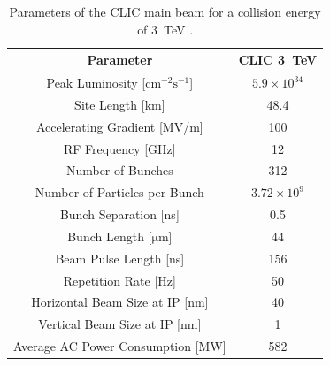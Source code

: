 \begin{table}
  \begin{center}
  	\begin{tabular}{| c c |}
	   \hline
       Parameter & CLIC 3~TeV\\
       \hline
       Peak Luminosity [\(\mathrm{cm^{-2}s^{-1}}\)] & \(5.9\times10^{34}\) \\
       Site Length [km] & 48.4 \\
       Accelerating Gradient [MV/m] & 100 \\
	   RF Frequency [GHz] & 12 \\
	   Number of Bunches & 312 \\
	   Number of Particles per Bunch & \(3.72\times10^9\) \\
	   Bunch Separation [ns] & 0.5 \\
	   Bunch Length [\(\mathrm{\mu m}\)] & 44 \\
	   Beam Pulse Length [ns]  & 156 \\
	   Repetition Rate [Hz] & 50 \\
	   Horizontal Beam Size at IP [nm] & 40 \\
	   Vertical Beam Size at IP [nm] & 1 \\
	   Average AC Power Consumption [MW] & 582 \\
	   \hline
    \end{tabular}
    \caption{Parameters of the CLIC main beam for a collision energy of 3~TeV \cite{clicCDR}.}
  	\label{t:clicParams}
  \end{center}
\end{table}



